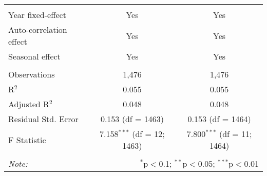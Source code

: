\begin{table}[!htbp]
\begin{tabular}{@{\extracolsep{5pt}}lcc}
\hline \\[-1.8ex] 
Year fixed-effect & Yes & Yes \\ 
Auto-correlation effect & Yes & Yes \\ 
Seasonal effect & Yes & Yes \\ 
\hline \\[-1.8ex] 
Observations & 1,476 & 1,476 \\ 
R$^{2}$ & 0.055 & 0.055 \\ 
Adjusted R$^{2}$ & 0.048 & 0.048 \\ 
Residual Std. Error & 0.153 (df = 1463) & 0.153 (df = 1464) \\ 
F Statistic & 7.158$^{***}$ (df = 12; 1463) & 7.800$^{***}$ (df = 11; 1464) \\ 
\hline 
\hline \\[-1.8ex] 
\textit{Note:}  & \multicolumn{2}{r}{$^{*}$p$<$0.1; $^{**}$p$<$0.05; $^{***}$p$<$0.01} \\ 
\end{tabular} 
\end{table} 
